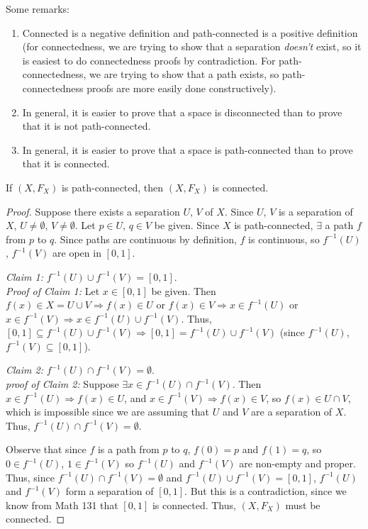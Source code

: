 Some remarks: 
\begin{enumerate}
\item Connected is a negative definition and path-connected is a positive definition (for connectedness, we are trying to show that a separation \emph{doesn't} exist, so it is easiest to do connectedness proofs by contradiction. For path-connectedness, we are trying to show that a path exists, so path-connectedness proofs are more easily done constructively). 
\item In general, it is easier to prove that a space is disconnected than to prove that it is not path-connected. 
\item In general, it is easier to prove that a space is path-connected than to prove that it is connected. 
\end{enumerate}
\begin{theorem}
If $(X, F_X)$ is path-connected, then $(X, F_X)$ is connected. 
\end{theorem}
\begin{proof}
Suppose there exists a separation $U$, $V$ of $X$. Since $U$, $V$ is a separation of $X$, $U \neq \emptyset$, $V \neq \emptyset$. Let $p \in U$, $q \in V$ be given. Since $X$ is path-connected, $\exists$ a path $f$ from $p$ to $q$. Since paths are continuous by definition, $f$ is continuous, so $f^{-1}(U)$, $f^{-1}(V)$ are open in $[0,1]$. 

\emph{Claim 1:} $f^{-1}(U) \cup f^{-1}(V) = [0,1]$. \\
\emph{Proof of Claim 1:} Let $x \in [0,1]$ be given. Then $f(x) \in X = U \cup V \Rightarrow f(x) \in U$ or $f(x) \in V \Rightarrow x \in f^{-1}(U)$ or $x \in f^{-1}(V) \Rightarrow x \in f^{-1}(U) \cup f^{-1}(V)$. Thus, $[0,1] \subseteq f^{-1}(U) \cup f^{-1}(V) \Rightarrow [0,1] = f^{-1}(U) \cup f^{-1}(V)$ (since $f^{-1}(U)$, $f^{-1}(V) \subseteq [0,1]$).

\emph{Claim 2:} $f^{-1}(U) \cap f^{-1}(V) = \emptyset$. \\
\emph{proof of Claim 2:} Suppose $\exists x \in f^{-1}(U) \cap f^{-1}(V)$. Then $x \in f^{-1}(U) \Rightarrow f(x) \in U$, and $x \in f^{-1}(V) \Rightarrow f(x) \in V$, so $f(x) \in U \cap V$, which is impossible since we are assuming that $U$ and $V$ are a separation of $X$. Thus, $f^{-1}(U) \cap f^{-1}(V) = \emptyset$.

Observe that since $f$ is a path from $p$ to $q$, $f(0) = p$ and $f(1) = q$, so $0 \in f^{-1}(U)$, $1 \in f^{-1}(V)$ so $f^{-1}(U)$ and $f^{-1}(V)$ are non-empty and proper. Thus, since $f^{-1}(U) \cap f^{-1}(V) = \emptyset$ and $f^{-1}(U) \cup f^{-1}(V) = [0,1]$, $f^{-1}(U)$ and $f^{-1}(V)$ form a separation of $[0,1]$. But this is a contradiction, since we know from Math 131 that $[0,1]$ is connected. Thus, $(X, F_X)$ must be connected. 
\end{proof}

